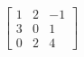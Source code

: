     \begin{center}
        \begin{equation*}
            \begin{bmatrix}
                1 & 2 & -1 \\
                3 & 0 & 1 \\
                0 & 2 & 4
            \end{bmatrix}
        \end{equation*}
    \end{center}

